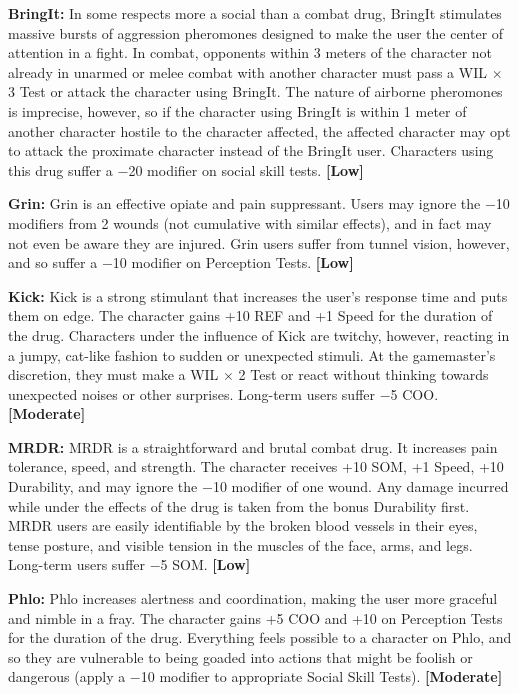 \textbf{BringIt:} In some respects more a social than a combat drug, BringIt stimulates massive bursts of aggression pheromones designed to make the user the center of attention in a fight. In combat, opponents within 3 meters of the character not already in unarmed or melee combat with another character must pass a WIL $\times$ 3 Test or attack the character using BringIt. The nature of airborne pheromones is imprecise, however, so if the character using BringIt is within 1 meter of another character hostile to the character affected, the affected character may opt to attack the proximate character instead of the BringIt user. Characters using this drug suffer a $-$20 modifier on social skill tests. \textbf{[Low]}

\textbf{Grin:} Grin is an effective opiate and pain suppressant. Users may ignore the $-$10 modifiers from 2 wounds (not cumulative with similar effects), and in fact may not even be aware they are injured. Grin users suffer from tunnel vision, however, and so suffer a $-$10 modifier on Perception Tests. \textbf{[Low]}

\textbf{Kick:} Kick is a strong stimulant that increases the user’s response time and puts them on edge. The character gains +10 REF and +1 Speed for the duration of the drug. Characters under the influence of Kick are twitchy, however, reacting in a jumpy, cat-like fashion to sudden or unexpected stimuli. At the gamemaster’s discretion, they must make a WIL $\times$ 2 Test or react without thinking towards unexpected noises or other surprises. Long-term users suffer $-$5 COO. \textbf{[Moderate]}

\textbf{MRDR:} MRDR is a straightforward and brutal combat drug. It increases pain tolerance, speed, and strength. The character receives +10 SOM, +1 Speed, +10 Durability, and may ignore the $-$10 modifier of one wound. Any damage incurred while under the effects of the drug is taken from the bonus Durability first. MRDR users are easily identifiable by the broken blood vessels in their eyes, tense posture, and visible tension in the muscles of the face, arms, and legs. Long-term users suffer $-$5 SOM. \textbf{[Low]}

\textbf{Phlo:} Phlo increases alertness and coordination, making the user more graceful and nimble in a fray. The character gains +5 COO and +10 on Perception Tests for the duration of the drug. Everything feels possible to a character on Phlo, and so they are vulnerable to being goaded into actions that might be foolish or dangerous (apply a $-$10 modifier to appropriate Social Skill Tests). \textbf{[Moderate]}

